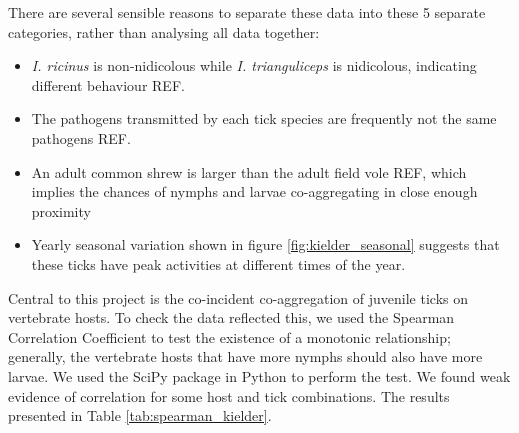 \documentclass{article}
\begin{document}
There are several sensible reasons to separate these data into these 5 separate categories, rather than analysing all data together:

\begin{itemize}
    \item \textit{I. ricinus} is non-nidicolous while \textit{I. trianguliceps} is nidicolous, indicating different behaviour REF.
    \item The pathogens transmitted by each tick species are frequently not the same pathogens REF.
    \item An adult common shrew is larger than the adult field vole REF, which implies the chances of nymphs and larvae co-aggregating in close enough proximity 
    \item Yearly seasonal variation shown in figure \ref{fig:kielder_seasonal} suggests that these ticks have peak activities at different times of the year.
\end{itemize}

Central to this project is the co-incident co-aggregation of juvenile ticks on vertebrate hosts. To check the data reflected this, we used the Spearman Correlation Coefficient to test the existence of a monotonic relationship; generally, the vertebrate hosts that have more nymphs should also have more larvae. 
We used the SciPy package in Python to perform the test. We found weak evidence of correlation for some host and tick combinations. The results presented in Table \ref{tab:spearman_kielder}.
\end{document}
